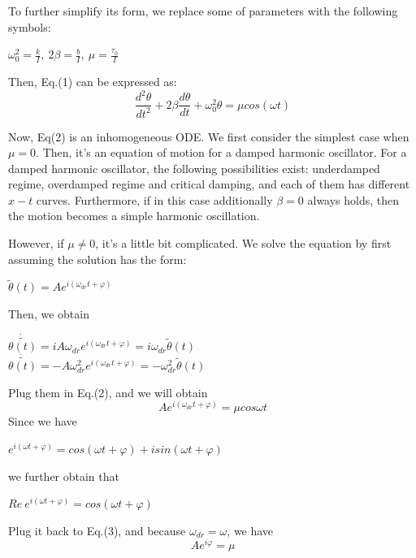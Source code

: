 \documentclass[a4paper,12pt]{article}
\begin{document}
To further simplify its form, we replace some of parameters with the following symbols:
\begin{center}
$\displaystyle\omega_0^2 = \frac{k}{I}, ~ 2\beta = \frac{b}{I}, ~\mu = \frac{\tau_0}{I}$
\end{center}
Then, Eq.(1) can be expressed as:
\begin{equation}
\displaystyle \frac{d^2\theta}{dt^2} + 2\beta \frac{d\theta}{dt} + \omega_0^2 \theta = \mu cos(\omega t)
\end{equation}
\par Now, Eq(2) is an inhomogeneous ODE. We first consider the simplest case when $\mu = 0$. Then, it's an equation of motion for a damped harmonic oscillator. For a damped harmonic oscillator, the following possibilities exist: underdamped regime, overdamped regime and critical damping, and each of them has different $x-t$ curves. Furthermore, if in this case additionally $\beta = 0$ always holds, then the motion becomes a simple harmonic oscillation.
\par However, if $\mu \not = 0$, it's a little bit complicated. We solve the equation by first assuming the solution has the form:
\begin{center}
$\displaystyle \widetilde\theta(t) = A e^{i(\omega_{dr} t + \varphi)}$
\end{center}
Then, we obtain 
\begin{center}
$\displaystyle \dot{\widetilde{\theta(t)}} = iA\omega_{dr} e^{i(\omega_{dr} t + \varphi)} = i\omega_{dr}\widetilde\theta(t)$\\
[3 mm]
$\displaystyle \ddot{\widetilde{\theta(t)}} = -A\omega_{dr}^2 e^{i(\omega_{dr} t + \varphi)} = -\omega_{dr}^2\widetilde\theta(t)$
\end{center}
Plug them in Eq.(2), and we will obtain 
\begin{equation}
[(\omega_0^2-\omega_{dr}^2) + 2i\beta \omega_{dr}] A e^{i(\omega_{dr} t + \varphi)} = \mu cos\omega t
\end{equation}
Since we have
\begin{center}
$e^{i(\omega t + \varphi)} = cos(\omega t + \varphi) + i sin(\omega t + \varphi)$
\end{center}
we further obtain that 
\begin{center}
$Re~e^{i(\omega t + \varphi)} = cos(\omega t + \varphi) $
\end{center}
Plug it back to Eq.(3), and because $\omega_{dr} = \omega$, we have 
\begin{equation}
[(\omega_0^2-\omega^2) + 2i\beta \omega] A e^{i\varphi} = \mu
\end{equation}
\end{document}
